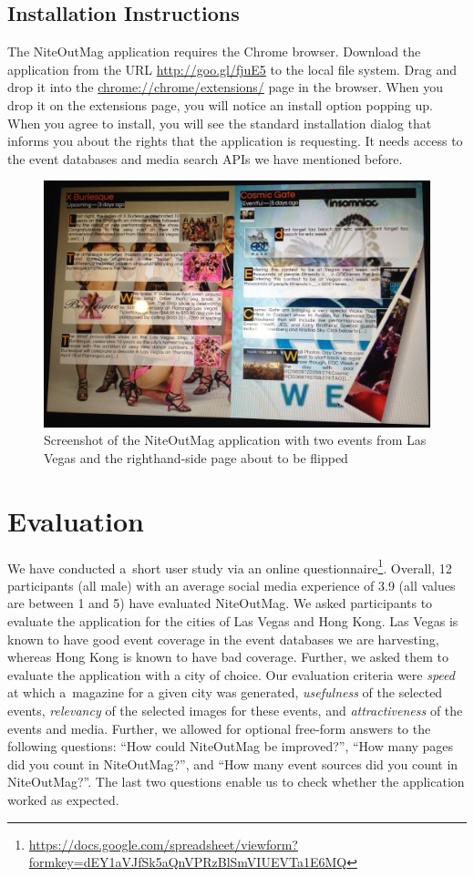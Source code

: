 \documentclass[runningheads,a4paper]{llncs}
\begin{document}
{\subsection{Installation Instructions}
The NiteOutMag application requires the Chrome browser. Download the application from the URL \url{http://goo.gl/fjuE5} to the local file system. Drag and drop it into the \url{chrome://chrome/extensions/} page in the browser. When you drop it on the extensions page, you will notice an install option popping up. When you agree to install, you will see the standard installation dialog that informs you about the rights that the application is requesting. It needs access to the event databases and media search APIs we have mentioned before.
\begin{figure}[htbp]
\centering
\includegraphics[width=0.8\columnwidth]{./screenshot.jpg}
\caption{Screenshot of the NiteOutMag application with two events from Las Vegas and the righthand-side page about to be flipped}
\label{fig:screenshot}
\end{figure}


\section{Evaluation}                                                        \label{sec:evaluation}
We have conducted a~short user study via an online questionnaire\footnote{\url{https://docs.google.com/spreadsheet/viewform?formkey=dEY1aVJfSk5aQnVPRzBlSmVIUEVTa1E6MQ}}. Overall, 12 participants (all male) with an average social media experience of 3.9 (all values are between 1 and 5) have evaluated NiteOutMag. We asked participants to evaluate the application for the cities of Las Vegas and Hong Kong. Las Vegas is known to have good event coverage in the event databases we are harvesting, whereas Hong Kong is known to have bad coverage. Further, we asked them to evaluate the application with a city of choice. Our evaluation criteria were
\emph{speed} at which a~magazine for a given city was generated, \emph{usefulness} of the selected events, \emph{relevancy} of the selected images for these events, and \emph{attractiveness} of the events and media. Further, we allowed for optional free-form answers to the following questions: ``How could NiteOutMag be improved?'', ``How many pages did you count in NiteOutMag?'', and ``How many event sources did you count in NiteOutMag?''. The last two questions enable us to check whether the application worked as expected.

}
\end{document}
